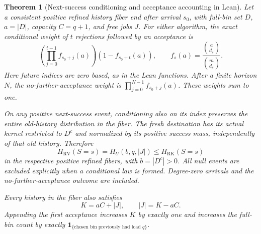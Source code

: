 \documentclass[11pt]{article}
\newtheorem{theorem}{Theorem}
\begin{document}
\begin{theorem}[Next-success conditioning and acceptance accounting in Lean]\label{thm:leanwaiting}
Let a consistent positive refined history fiber end after arrival $s_0$,
with full-bin set $D$, $a=|D|$, capacity $C=q+1$, and free jobs $J$.
For either algorithm, the exact conditional weight of $t$ rejections
followed by an acceptance is
\[
 \left(\prod_{j=0}^{t-1}f_{s_0+j}(a)\right)
 (1-f_{s_0+t}(a)),\qquad
 f_s(a)=\frac{\binom a{d_s}}{\binom m{d_s}}.
\]
Here future indices are zero based, as in the Lean functions. After a
finite horizon $N$, the no-further-acceptance weight is
$\prod_{j=0}^{N-1}f_{s_0+j}(a)$. These weights sum to one.

On any positive next-success event, conditioning also on its index
preserves the entire old-history distribution in the fiber. The fresh
destination has its actual kernel restricted to $D^c$ and normalized by
its positive success mass, independently of that old history. Therefore
\[
 H_{\mathrm{RV}}(S=s)=H_U(b,q,|J|)
 \leq H_{\mathrm{RK}}(S=s)
\]
in the respective positive refined fibers, with $b=|D^c|>0$.
All null events are excluded explicitly when a conditional law is formed.
Degree-zero arrivals and the no-further-acceptance outcome are included.

Every history in the fiber also satisfies
\[
 K=aC+|J|,\qquad |J|=K-aC.
\]
Appending the first acceptance increases $K$ by exactly one and increases
the full-bin count by exactly
$\mathbf1_{\{\text{chosen bin previously had load }q\}}$.
\end{theorem}
\end{document}
